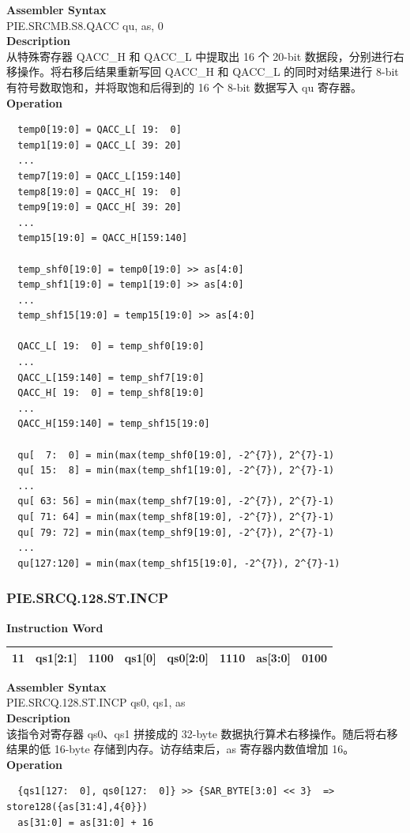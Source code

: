 \textbf{Assembler Syntax} \\
PIE.SRCMB.S8.QACC qu, as, 0 \\
\textbf{Description} \\
从特殊寄存器 QACC\_H 和 QACC\_L 中提取出 16 个 20-bit 数据段，分别进行右移操作。将右移后结果重新写回 QACC\_H 和 QACC\_L 的同时对结果进行 8-bit 有符号数取饱和，并将取饱和后得到的 16 个 8-bit 数据写入 qu 寄存器。\\
\textbf{Operation}
\begin{lstlisting}
  temp0[19:0] = QACC_L[ 19:  0]
  temp1[19:0] = QACC_L[ 39: 20]
  ...
  temp7[19:0] = QACC_L[159:140]
  temp8[19:0] = QACC_H[ 19:  0]
  temp9[19:0] = QACC_H[ 39: 20]
  ...
  temp15[19:0] = QACC_H[159:140]

  temp_shf0[19:0] = temp0[19:0] >> as[4:0]
  temp_shf1[19:0] = temp1[19:0] >> as[4:0]
  ...
  temp_shf15[19:0] = temp15[19:0] >> as[4:0]

  QACC_L[ 19:  0] = temp_shf0[19:0]
  ...
  QACC_L[159:140] = temp_shf7[19:0]
  QACC_H[ 19:  0] = temp_shf8[19:0]
  ...
  QACC_H[159:140] = temp_shf15[19:0]

  qu[  7:  0] = min(max(temp_shf0[19:0], -2^{7}), 2^{7}-1)
  qu[ 15:  8] = min(max(temp_shf1[19:0], -2^{7}), 2^{7}-1)
  ...
  qu[ 63: 56] = min(max(temp_shf7[19:0], -2^{7}), 2^{7}-1)
  qu[ 71: 64] = min(max(temp_shf8[19:0], -2^{7}), 2^{7}-1)
  qu[ 79: 72] = min(max(temp_shf9[19:0], -2^{7}), 2^{7}-1)
  ...
  qu[127:120] = min(max(temp_shf15[19:0], -2^{7}), 2^{7}-1)
\end{lstlisting}

\newpage
\subsubsection{PIE.SRCQ.128.ST.INCP}\label{instruction:PIESRCQ128STINCP}
\setlength\tabcolsep{6pt}
\textbf{Instruction Word} \\
\begin{tabular}{|c|c|c|c|c|c|c|c|}
	\hline
	11 & qs1[2:1] & 1100 & qs1[0] & qs0[2:0] & 1110 & as[3:0] & 0100 \\
	\hline
\end{tabular}

\textbf{Assembler Syntax} \\
PIE.SRCQ.128.ST.INCP qs0, qs1, as \\
\textbf{Description} \\
该指令对寄存器 qs0、qs1 拼接成的 32-byte 数据执行算术右移操作。随后将右移结果的低 16-byte 存储到内存。访存结束后，as 寄存器内数值增加 16。\\
\textbf{Operation}
\begin{lstlisting}
  {qs1[127:  0], qs0[127:  0]} >> {SAR_BYTE[3:0] << 3}  => store128({as[31:4],4{0}})
  as[31:0] = as[31:0] + 16
\end{lstlisting}

